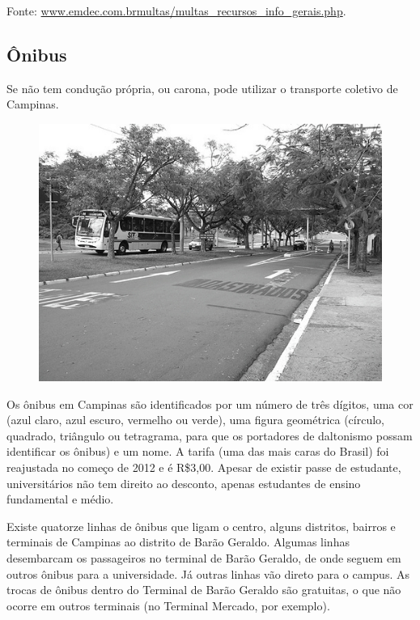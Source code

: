 Fonte: \url{www.emdec.com.brmultas/multas_recursos_info_gerais.php}.

\subsection{Ônibus}

Se não tem condução própria, ou carona, pode utilizar o transporte coletivo de
Campinas.
\begin{figure}[h!]
    \centering
    \includegraphics[scale=0.58,keepaspectratio=true]{img/imgs/8-transporte/-085.jpg}
\end{figure}


Os ônibus em Campinas são identificados por um número de três dígitos,
uma cor (azul claro, azul escuro, vermelho ou verde), uma figura geométrica
(círculo, quadrado, triângulo ou tetragrama, para que os portadores de
daltonismo possam identificar os ônibus) e um nome. A tarifa (uma das mais caras
do Brasil) foi reajustada no começo de 2012 e é R\$3,00. Apesar de existir
passe de estudante, universitários não tem direito ao desconto, apenas
estudantes de ensino fundamental e médio.

Existe quatorze linhas de ônibus que ligam o centro, alguns distritos, bairros
e terminais de Campinas ao distrito de Barão Geraldo. Algumas linhas desembarcam
os passageiros no terminal de Barão Geraldo, de onde seguem em outros ônibus
para a universidade. Já outras linhas vão direto para o campus. As trocas de
ônibus dentro do Terminal de Barão Geraldo são gratuitas, o que não ocorre em
outros terminais (no Terminal Mercado, por exemplo).

